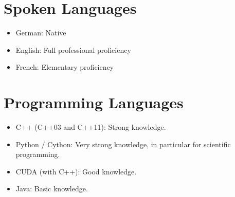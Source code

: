 \documentclass[a4paper,11pt]{article}
\begin{document}
\section{Spoken Languages}
\begin{itemize}
    \item German: Native
    \item English: Full professional proficiency
    \item French: Elementary proficiency
\end{itemize}

\section{Programming Languages}
\begin{itemize}
    \item C++ (C++03 and C++11): Strong knowledge.
    \item Python / Cython: Very strong knowledge, in particular for scientific programming.
    \item CUDA (with C++): Good knowledge.
    \item Java: Basic knowledge.
\end{itemize}

\begin{publications}
\end{publications}
\end{document}
